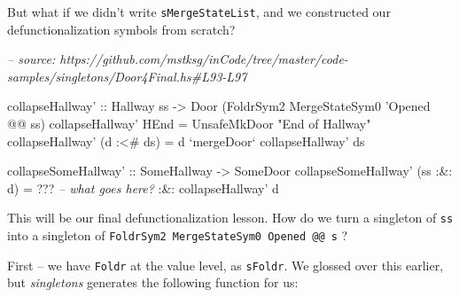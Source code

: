 \documentclass[]{article}
\newenvironment{Shaded}{}{}
\newcommand{\CommentTok}[1]{\textcolor[rgb]{0.38,0.63,0.69}{\textit{#1}}}
\newcommand{\DataTypeTok}[1]{\textcolor[rgb]{0.56,0.13,0.00}{#1}}
\newcommand{\FunctionTok}[1]{\textcolor[rgb]{0.02,0.16,0.49}{#1}}
\newcommand{\NormalTok}[1]{#1}
\newcommand{\OtherTok}[1]{\textcolor[rgb]{0.00,0.44,0.13}{#1}}
\newcommand{\StringTok}[1]{\textcolor[rgb]{0.25,0.44,0.63}{#1}}
\begin{document}
But what if we didn't write \texttt{sMergeStateList}, and we constructed our
defunctionalization symbols from scratch?

\begin{Shaded}
\begin{Highlighting}[]
\CommentTok{-- source: https://github.com/mstksg/inCode/tree/master/code-samples/singletons/Door4Final.hs#L93-L97}

\NormalTok{collapseHallway'}
\OtherTok{    ::} \DataTypeTok{Hallway}\NormalTok{ ss}
    \OtherTok{->} \DataTypeTok{Door}\NormalTok{ (}\DataTypeTok{FoldrSym2} \DataTypeTok{MergeStateSym0}\NormalTok{ '}\DataTypeTok{Opened} \FunctionTok{@@}\NormalTok{ ss)}
\NormalTok{collapseHallway' }\DataTypeTok{HEnd}       \FunctionTok{=} \DataTypeTok{UnsafeMkDoor} \StringTok{"End of Hallway"}
\NormalTok{collapseHallway' (d }\FunctionTok{:<#}\NormalTok{ ds) }\FunctionTok{=}\NormalTok{ d }\OtherTok{`mergeDoor`}\NormalTok{ collapseHallway' ds}

\OtherTok{collapseSomeHallway' ::} \DataTypeTok{SomeHallway} \OtherTok{->} \DataTypeTok{SomeDoor}
\NormalTok{collapseSomeHallway' (ss }\FunctionTok{:&:}\NormalTok{ d) }\FunctionTok{=} \FunctionTok{???}    \CommentTok{-- what goes here?}
                              \FunctionTok{:&:}\NormalTok{ collapseHallway' d}
\end{Highlighting}
\end{Shaded}

This will be our final defunctionalization lesson. How do we turn a singleton of
\texttt{ss} into a singleton of
\texttt{FoldrSym2\ MergeStateSym0\ \textquotesingle{}Opened\ @@\ s} ?

First -- we have \texttt{Foldr} at the value level, as \texttt{sFoldr}. We
glossed over this earlier, but \emph{singletons} generates the following
function for us:
\end{document}
